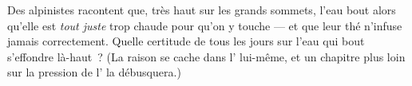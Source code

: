 \begin{exercise}[$\star\star$]\label{exo:g4:changes-of-state:11}
Des alpinistes racontent que, très haut sur les grands sommets, l'eau
bout alors qu'elle est \emph{tout juste} trop chaude pour qu'on y
touche --- et que leur thé n'infuse jamais correctement. Quelle
certitude de tous les jours sur l'eau qui bout s'effondre là-haut~?
(La raison se cache dans l' lui-même, et un chapitre plus loin sur
la pression de l' la débusquera.)
\end{exercise}
